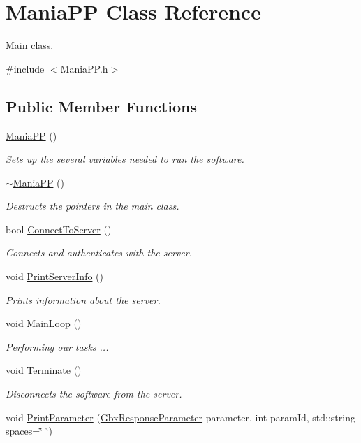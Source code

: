 \hypertarget{classManiaPP}{\section{Mania\-P\-P Class Reference}
\label{classManiaPP}
}


Main class.  




{\ttfamily \#include $<$Mania\-P\-P.\-h$>$}

\subsection*{Public Member Functions}
\begin{DoxyCompactItemize}
\item 
\hyperlink{classManiaPP_ae56f6623dc89f2c0b75bec631cfc2d19}{Mania\-P\-P} ()
\begin{DoxyCompactList}\small\item\em Sets up the several variables needed to run the software. \end{DoxyCompactList}\item 
\hyperlink{classManiaPP_a1c78c3b51db550609011fb6fdcb26ec8}{$\sim$\-Mania\-P\-P} ()
\begin{DoxyCompactList}\small\item\em Destructs the pointers in the main class. \end{DoxyCompactList}\item 
bool \hyperlink{classManiaPP_a22561171876e54dbf633c70d9924c06a}{Connect\-To\-Server} ()
\begin{DoxyCompactList}\small\item\em Connects and authenticates with the server. \end{DoxyCompactList}\item 
void \hyperlink{classManiaPP_a56d2774a29f21b3a164ae1f7ea6bd88b}{Print\-Server\-Info} ()
\begin{DoxyCompactList}\small\item\em Prints information about the server. \end{DoxyCompactList}\item 
void \hyperlink{classManiaPP_a8dff9e8e3835c3cac0df105a7bcce43c}{Main\-Loop} ()
\begin{DoxyCompactList}\small\item\em Performing our tasks ... \end{DoxyCompactList}\item 
void \hyperlink{classManiaPP_a87fd53fffe4a1840834a90ab575f5ce6}{Terminate} ()
\begin{DoxyCompactList}\small\item\em Disconnects the software from the server. \end{DoxyCompactList}\item 
void \hyperlink{classManiaPP_a3548cbafbf949dbb9d210c08adb5f7de}{Print\-Parameter} (\hyperlink{classGbxResponseParameter}{Gbx\-Response\-Parameter} parameter, int param\-Id, std\-::string spaces=\char`\"{}    \char`\"{})
\end{DoxyCompactItemize}
